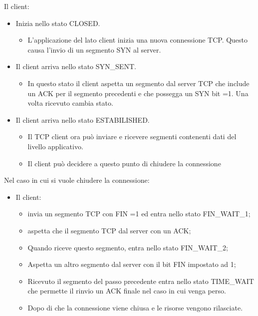 \documentclass{book}
\begin{document}
Il client:
\begin{itemize}
  \item Inizia nello stato CLOSED.
  \begin{itemize}
    \item L'applicazione del lato client inizia una nuova connessione TCP.
    Questo causa l'invio di un segmento SYN al server.
  \end{itemize}
  \item Il client arriva nello stato SYN\_SENT.
  \begin{itemize}
    \item In questo stato il client aspetta un segmento dal server TCP che
    include un ACK per il segmento precedenti e che possegga un SYN bit =1.
    Una volta ricevuto cambia stato.
  \end{itemize}
  \item Il client arriva nello stato ESTABILISHED.
  \begin{itemize}
    \item Il TCP client ora pu{\`o} inviare e ricevere segmenti contenenti
    dati del livello applicativo.
    
    \item Il client pu{\`o} decidere a questo punto di chiudere la
    connessione
  \end{itemize}
\end{itemize}
Nel caso in cui si vuole chiudere la connessione:
\begin{itemize}
  \item Il client:
  \begin{itemize}
    \item invia un segmento TCP con FIN =1 ed entra nello stato FIN\_WAIT\_1;
    
    \item aspetta che il segmento TCP dal server con un ACK;
    
    \item Quando riceve questo segmento, entra nello stato FIN\_WAIT\_2;
    
    \item Aspetta un altro segmento dal server con il bit FIN impostato ad 1;
    
    \item Ricevuto il segmento del passo precedente entra nello stato
    TIME\_WAIT che permette il rinvio un ACK finale nel caso in cui venga
    perso.
    
    \item Dopo di che la connessione viene chiusa e le risorse vengono
    rilasciate.
  \end{itemize}
\end{itemize}
\end{document}
